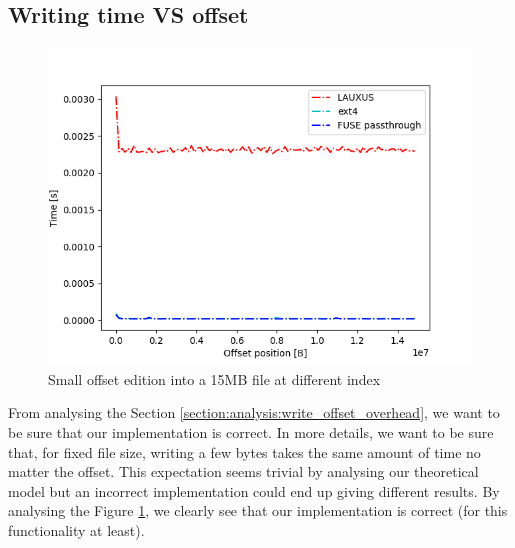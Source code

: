 \documentclass[../main.tex]{subfiles}
\begin{document}
\subsection{Writing time VS offset}
\begin{figure}[h]
    \centering
    \includegraphics[width=\textwidth]{images/appendix/per_offset_write}
    
    \caption{Small offset edition into a 15MB file at different index}
    \label{appendix:figure:per_offset_write}
\end{figure}
\par From analysing the Section \ref{section:analysis:write_offset_overhead}, we want to be sure that our implementation is correct. In more details, we want to be sure that, for fixed file size, writing a few bytes takes the same amount of time no matter the offset. This expectation seems trivial by analysing our theoretical model but an incorrect implementation could end up giving different results. By analysing the Figure \ref{appendix:figure:per_offset_write}, we clearly see that our implementation is correct (for this functionality at least).
\end{document}
